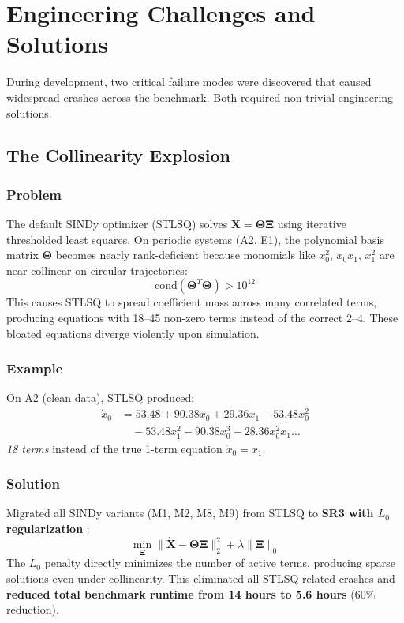 \section{Engineering Challenges and Solutions}
\label{sec:engineering}

During development, two critical failure modes were discovered that caused widespread crashes across the benchmark. Both required non-trivial engineering solutions.

\subsection{The Collinearity Explosion}
\label{sec:collinearity}

\subsubsection{Problem}
The default SINDy optimizer (STLSQ) solves $\dot{\mathbf{X}} = \boldsymbol{\Theta}\boldsymbol{\Xi}$ using iterative thresholded least squares. On periodic systems (A2, E1), the polynomial basis matrix $\boldsymbol{\Theta}$ becomes nearly rank-deficient because monomials like $x_0^2$, $x_0 x_1$, $x_1^2$ are near-collinear on circular trajectories:
\begin{equation}
\text{cond}(\boldsymbol{\Theta}^T\boldsymbol{\Theta}) > 10^{12}
\end{equation}
This causes STLSQ to spread coefficient mass across many correlated terms, producing equations with 18--45 non-zero terms instead of the correct 2--4. These bloated equations diverge violently upon simulation.

\subsubsection{Example}
On A2 (clean data), STLSQ produced:
\begin{align*}
\dot{x}_0 &= 53.48 + 90.38 x_0 + 29.36 x_1 - 53.48 x_0^2 \\
&\quad - 53.48 x_1^2 - 90.38 x_0^3 - 28.36 x_0^2 x_1 \ldots
\end{align*}
\textit{18 terms} instead of the true 1-term equation $\dot{x}_0 = x_1$.

\subsubsection{Solution}
Migrated all SINDy variants (M1, M2, M8, M9) from STLSQ to \textbf{SR3 with $L_0$ regularization} \cite{zheng2019}:
\begin{equation}
\min_{\boldsymbol{\Xi}} \|\dot{\mathbf{X}} - \boldsymbol{\Theta}\boldsymbol{\Xi}\|_2^2 + \lambda \|\boldsymbol{\Xi}\|_0
\end{equation}
The $L_0$ penalty directly minimizes the number of active terms, producing sparse solutions even under collinearity. This eliminated all STLSQ-related crashes and \textbf{reduced total benchmark runtime from 14 hours to 5.6 hours} (60\% reduction).

